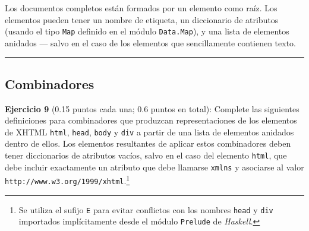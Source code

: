 \begin{Shaded}
\begin{Highlighting}[]
 
  \FunctionTok{=}   

 
  \FunctionTok{=}  
   

 
  \FunctionTok{=}    \NormalTok{[}\NormalTok{]}
  \FunctionTok{|}  
   
\end{Highlighting}
\end{Shaded}

Los documentos completos están formados por un elemento como raíz. Los
elementos pueden tener un nombre de etiqueta, un diccionario de
atributos (usando el tipo \texttt{Map} definido en el módulo
\texttt{Data.Map}), y una lista de elementos anidados --- salvo en el
caso de los elementos que sencillamente contienen texto.

\begin{center}\rule{3in}{0.4pt}\end{center}

\subsection{Combinadores}\label{combinadores}

\textbf{Ejercicio 9} (0.15 puntos cada una; 0.6 puntos en total):
Complete las siguientes definiciones para combinadores que produzcan
representaciones de los elementos de XHTML \texttt{html}, \texttt{head},
\texttt{body} y \texttt{div} a partir de una lista de elementos anidados
dentro de ellos. Los elementos resultantes de aplicar estos combinadores
deben tener diccionarios de atributos vacíos, salvo en el caso del
elemento \texttt{html}, que debe incluir exactamente un atributo que
debe llamarse \texttt{xmlns} y asociarse al valor
\texttt{http://www.w3.org/1999/xhtml}.\footnote{Se utiliza el sufijo
  \texttt{E} para evitar conflictos con los nombres \texttt{head} y
  \texttt{div} importados implícitamente desde el módulo
  \texttt{Prelude} de \emph{Haskell}.}

\begin{Shaded}
\begin{Highlighting}[]
 \NormalTok{[}\NormalTok{] }\OtherTok{->} 
\FunctionTok{=}    \NormalTok{) }
\FunctionTok{=}   
\FunctionTok{=}   
\FunctionTok{=}    
\end{Highlighting}
\end{Shaded}

